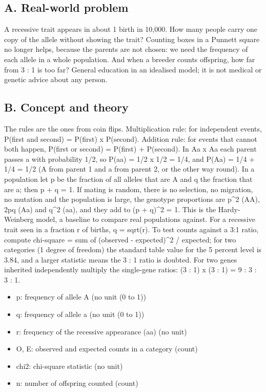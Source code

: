 \documentclass[11pt,a4paper]{article}
\begin{document}
\subsection*{A. Real-world problem}
A recessive trait appears in about 1 birth in 10,000. How many people carry one copy of the allele without showing the trait? Counting boxes in a Punnett square no longer helps, because the parents are not chosen: we need the frequency of each allele in a whole population. And when a breeder counts offspring, how far from 3 : 1 is too far? General education in an idealised model; it is not medical or genetic advice about any person.

\subsection*{B. Concept and theory}
The rules are the ones from coin flips. Multiplication rule: for independent events, P(first and second) = P(first) x P(second). Addition rule: for events that cannot both happen, P(first or second) = P(first) + P(second). In Aa x Aa each parent passes a with probability 1/2, so P(aa) = 1/2 x 1/2 = 1/4, and P(Aa) = 1/4 + 1/4 = 1/2 (A from parent 1 and a from parent 2, or the other way round). In a population let p be the fraction of all alleles that are A and q the fraction that are a; then p + q = 1. If mating is random, there is no selection, no migration, no mutation and the population is large, the genotype proportions are p\textasciicircum{}2 (AA), 2pq (Aa) and q\textasciicircum{}2 (aa), and they add to (p + q)\textasciicircum{}2 = 1. This is the Hardy-Weinberg model, a baseline to compare real populations against. For a recessive trait seen in a fraction r of births, q = sqrt(r). To test counts against a 3:1 ratio, compute chi-square = sum of (observed - expected)\textasciicircum{}2 / expected; for two categories (1 degree of freedom) the standard table value for the 5 percent level is 3.84, and a larger statistic means the 3 : 1 ratio is doubted. For two genes inherited independently multiply the single-gene ratios: (3 : 1) x (3 : 1) = 9 : 3 : 3 : 1.

\begin{itemize}[nosep]
\item p: frequency of allele A (no unit (0 to 1))
\item q: frequency of allele a (no unit (0 to 1))
\item r: frequency of the recessive appearance (aa) (no unit)
\item O, E: observed and expected counts in a category (count)
\item chi2: chi-square statistic (no unit)
\item n: number of offspring counted (count)
\end{itemize}
\end{document}
